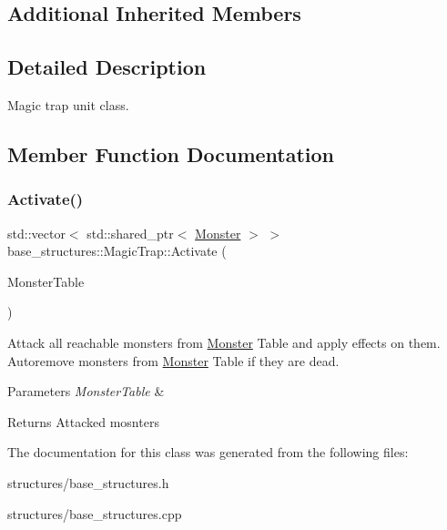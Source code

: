 \subsection*{Additional Inherited Members}


\subsection{Detailed Description}
Magic trap unit class. 

\subsection{Member Function Documentation}
\mbox{\label{classbase__structures_1_1MagicTrap_abf07990e9b4de0990474820f083b5f8f}} 
\subsubsection{\texorpdfstring{Activate()}{Activate()}}
{\footnotesize\ttfamily std\+::vector$<$ std\+::shared\+\_\+ptr$<$ \hyperlink{classbase__structures_1_1Monster}{Monster} $>$ $>$ base\+\_\+structures\+::\+Magic\+Trap\+::\+Activate (\begin{DoxyParamCaption}\item[{Monster\+Table\+\_\+ \&}]{Monster\+Table }\end{DoxyParamCaption})}

Attack all reachable monsters from \hyperlink{classbase__structures_1_1Monster}{Monster} Table and apply effects on them. Autoremove monsters from \hyperlink{classbase__structures_1_1Monster}{Monster} Table if they are dead. 
\begin{DoxyParams}{Parameters}
{\em Monster\+Table} & \\
\hline
\end{DoxyParams}
\begin{DoxyReturn}{Returns}
Attacked mosnters 
\end{DoxyReturn}


The documentation for this class was generated from the following files\+:\begin{DoxyCompactItemize}
\item 
structures/base\+\_\+structures.\+h\item 
structures/base\+\_\+structures.\+cpp\end{DoxyCompactItemize}

